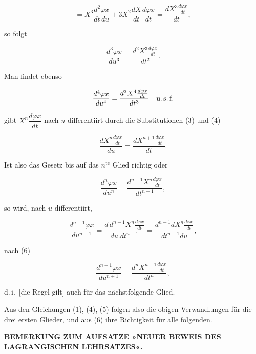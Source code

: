 
\[
= X^3\frac{d^2\varphi x}{dt\,du} + 3X^2\frac{dX}{dt}\frac{d\varphi x}{dt}
= \frac{dX^3 \frac{d\varphi x}{dt}}{dt},
\]

\noindent
so folgt

\begin{equation}\tag{5}
\frac{d^3\varphi x}{du^3} = \frac{d^2X^3 \frac{d\varphi x}{dt}}{dt^2}.
\end{equation}

\noindent\hspace*{\parindent}Man findet ebenso

\[
\frac{d^4\varphi x}{du^4} = \frac{d^3X^4 \frac{d\varphi x}{dt}}{dt^3} \quad \text{u.\,s.\,f.}
\]

\noindent\hspace*{\parindent} gibt $X^n\dfrac{d\varphi x}{dt}$ nach $u$ differentiirt durch die
Substitutionen (3) und (4)

\begin{equation}\tag{6}
\frac{dX^n \frac{d\varphi x}{dt}}{du} = \frac{dX^{n+1} \frac{d\varphi x}{dt}}{dt}.
\end{equation}

\noindent
Ist also das Gesetz bis auf das $n^{\text{te}}$ Glied richtig oder

\[
\frac{d^n\varphi x}{du^n} = \frac{d^{n-1}X^n \frac{d\varphi x}{dt}}{dt^{n-1}},
\]

\noindent
so wird, nach $u$ differentiirt,

\[
\frac{d^{n+1}\varphi x}{du^{n+1}} = \frac{d\,d^{n-1}X^n\frac{d\varphi x}{dt}}{du . dt^{n-1}}
= \frac{d^{n-1}dX^n\frac{d\varphi x}{dt}}{dt^{n-1}du},
\]

\noindent
[also] nach (6)

\begin{equation}\tag{7}
\frac{d^{n+1}\varphi x}{du^{n+1}} = \frac{d^nX^{n+1} \frac{d\varphi x}{dt}}{dt^n},
\end{equation}

\noindent
d.\,i.\ [die Regel gilt] auch für das nächstfolgende Glied.

\noindent\hspace*{\parindent}Aus den Gleichungen (1), (4), (5) folgen also die obigen Verwandlungen für die drei ersten
Glieder, und aus (6) ihre Richtigkeit für alle folgenden.

\medskip

\begin{center}
\textbf{BEMERKUNG ZUM AUFSATZE »NEUER BEWEIS DES LAGRANGISCHEN LEHRSATZES«.}
\end{center}

